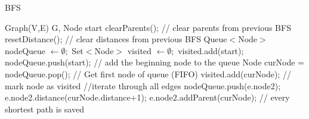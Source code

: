 \documentclass [12pt]{article}
\begin{document}
\begin{algorithm}[H]
  \caption{BFS}
  \label{BFS}
  \begin{algorithmic}[2]
    \Require Graph(V,E) G, Node start
    \State clearParents();    // clear parents from previous BFS
    \State resetDistance();   // clear distances from previous BFS
    \State Queue$<$Node$>$ nodeQueue $\gets \emptyset;$
    \State Set$<$Node$>$ visited $\gets \emptyset;$
    \State visited.add(start);
    \State nodeQueue.push(start); // add the beginning node to the queue 
    \State Node curNode = nodeQueue.pop(); // Get first node of queue (FIFO)
    \State visited.add(curNode); // mark node as visited
     //iterate through all edges  
    \State nodeQueue.push(e.node2);
    \State e.node2.distance(curNode.distance+1);
    \EndIf
    \State e.node2.addParent(curNode); // every shortest path is saved 
    \EndIf
    \EndFor
    \EndWhile
  \end{algorithmic}
\end{algorithm}
\end{document}
